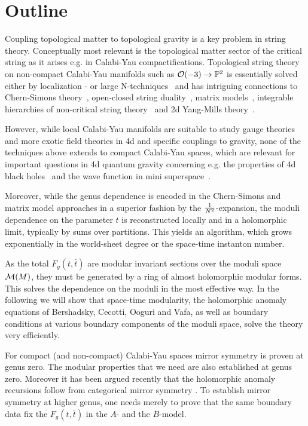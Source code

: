 \documentclass[12pt]{article}
\begin{document}
\tableofcontents


\section{Outline}

Coupling topological matter to topological gravity is a key
problem in string theory. Conceptually most relevant is the
topological matter sector of the critical string as it arises e.g. in
Calabi-Yau compactifications. Topological string theory on
non-compact Calabi-Yau manifolds such as ${\cal O}(-3)\rightarrow
\mathbb{P}^2$ is essentially solved either by localization -
\cite{Klemm:1999gm} or large N-techniques~\cite{Aganagic:2003db}
and has intriguing connections to Chern-Simons
theory~\cite{Witten:1992fb}, open-closed string
duality~\cite{Gopakumar:1998ki}, matrix
models~\cite{Dijkgraaf:2002fc}, integrable hierarchies of
non-critical string theory~\cite{Aganagic:2003qj} and 2d
Yang-Mills theory~\cite{Vafa:2004qa}.

However, while local Calabi-Yau manifolds are suitable to study
gauge theories and more exotic field theories in 4d and specific
couplings to gravity, none of the techniques above extends to
compact Calabi-Yau spaces, which are relevant for important
questions in 4d quantum gravity concerning e.g. the properties of
4d black holes~\cite{Ooguri:2004zv} and the wave function in mini
superspace~\cite{Ooguri:2005vr}.


Moreover, while the genus dependence is encoded in the
Chern-Simons and matrix model approaches in a superior fashion by
the ${1\over N^2}$-expansion, the moduli dependence on the
parameter $t$ is reconstructed locally and in a holomorphic limit,
typically by sums over partitions. This yields an algorithm, which
grows exponentially in the world-sheet degree or the
space-time instanton number.

As the total $F_g(t,\bar t)$ are modular invariant sections over
the moduli space ${\cal M}(M)$, they must be generated by a ring
of almost holomorphic modular forms.  This solves the dependence
on the moduli in the most effective way. In the following we will
show that space-time modularity, the holomorphic anomaly equations
of Bershadsky, Cecotti, Ooguri and Vafa, as well as boundary
conditions at various boundary components of the moduli space,
solve the theory very efficiently.

For compact (and non-compact) Calabi-Yau spaces mirror symmetry is
proven at genus zero. The modular properties that we need are also
established  at genus zero. Moreover it has been argued recently
that the  holomorphic anomaly recursions follow from categorical
mirror symmetry \cite{costello,kontsevich}. To establish  mirror
symmetry at higher genus, one needs merely to prove that the same
boundary data fix the $F_g(t,\bar t)$ in the $A$- and the
$B$-model.
\end{document}
